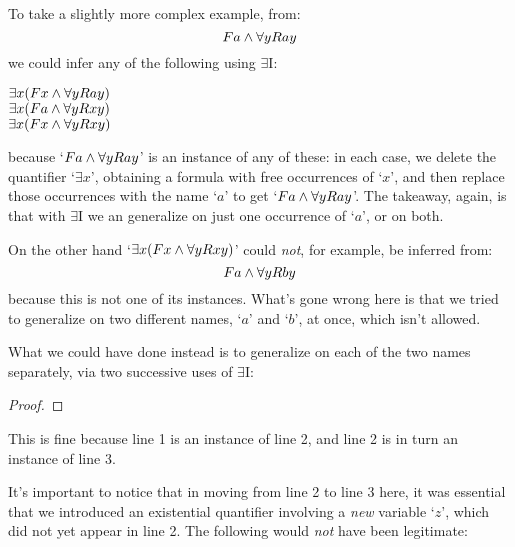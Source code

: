 To take a slightly more complex example, from:
$$Fa \wedge \forall yRay$$
we could infer any of the following using $\exists$I:
\begin{center}
$\exists x(Fx \wedge \forall yRay)$\\
$\exists x(Fa \wedge \forall yRxy)$\\
$\exists x(Fx \wedge \forall yRxy)$\\
\end{center}
because `$Fa \wedge \forall yRay$' is an instance of any of these: in each case, we delete the quantifier `$\exists x$', obtaining a formula with free occurrences of `$x$', and then replace those occurrences with the name `$a$' to get `$Fa \wedge \forall yRay$'. The takeaway, again, is that with $\exists$I we an generalize on just one occurrence of `$a$', or on both.

On the other hand `$\exists x(Fx \wedge \forall yRxy)$' could \emph{not}, for example, be inferred from:
$$Fa \wedge \forall yRby$$
because this is not one of its instances.  What's gone wrong here is that we tried to generalize on two different names, `$a$' and `$b$', at once, which isn't allowed.

What we could have done  instead is to generalize on each of the two names separately, via two successive uses of $\exists$I:

\begin{proof}
	 
	 
\end{proof}
This is fine because line 1 is an instance of line 2, and line 2 is in turn an instance of line 3.

It's important to notice that in moving from line 2 to line 3 here, it was essential that we introduced an existential quantifier involving a \emph{new} variable `$z$', which did not yet appear in line 2.  The following would \emph{not} have been legitimate:

